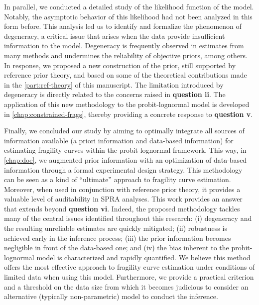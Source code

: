 In parallel, we conducted a detailed study of the likelihood function of the model. Notably, the asymptotic behavior of this likelihood had not been analyzed in this form before. This analysis led us to identify and formalize the phenomenon of degeneracy, a critical issue that arises when the data provide insufficient information to  the model. 
Degeneracy is frequently observed in estimates from many methods and
undermines the reliability of objective priors, among others. In response, we proposed a new construction of the prior, still supported by reference prior theory, and based on some of the theoretical contributions made in the \cref{part:ref-theory} of this manuscript. The limitation introduced by degeneracy is directly related to the concerns raised in \textbf{question ii}. The application of this new methodology to the probit-lognormal model is developed in \cref{chap:constrained-frags}, thereby providing a concrete response to \textbf{question v}.

Finally, we concluded our study by aiming to optimally integrate all sources of information available (a priori information and data-based information)
 for estimating fragility curves within the probit-lognormal framework. This way, in \cref{chap:doe}, we augmented prior information with an optimization of data-based information through a formal experimental design strategy. This methodology can be seen as a kind of ``ultimate'' approach to fragility curve estimation. 
 Moreover, when used in conjunction with reference prior theory, it provides a valuable level of auditability in SPRA analyses.
 This work provides an answer that extends beyond \textbf{question vi}. %
Indeed,
the proposed methodology tackles many of the central issues identified throughout this research: (i) degeneracy and the resulting unreliable estimates are quickly mitigated; (ii) robustness is achieved early in the inference process; (iii) the prior information becomes negligible in front of  the data-based one; and (iv) the bias inherent to the probit-lognormal model is characterized and rapidly quantified. We believe this method offers the most effective approach to fragility curve estimation under conditions of limited data when using this model. Furthermore, 
we provide a practical criterion and a threshold on the data size from which it becomes judicious to consider an alternative (typically non-parametric) model to conduct the inference.

